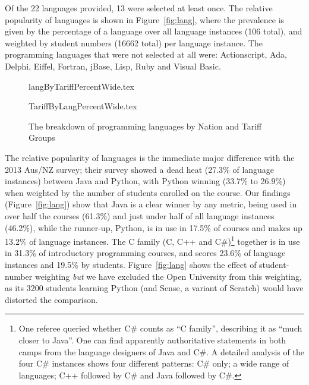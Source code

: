 \documentclass[english,submission]{programming}
\begin{document}
Of the 22 languages provided, 13 were selected at least once. The
relative popularity of languages is shown in Figure~\ref{fig:lang},
where the prevalence is given by the percentage of a language over all
language instances (106 total), and weighted by student numbers (16662
total) per language instance. The programming languages that were not
selected at all were: Actionscript, Ada, Delphi, Eiffel, Fortran,
jBase, Lisp, Ruby and Visual Basic.

\begin{figure}
\begin{center}
{langByTariffPercentWide.tex}
\end{center}%
%
\begin{center}
{TariffByLangPercentWide.tex}
\end{center}
\caption{The breakdown of programming languages by Nation and Tariff Groups\label{fig;LangTariff}}
\end{figure}

The relative popularity of languages is the immediate major difference
with the 2013 Aus/NZ survey; their survey showed a dead heat (27.3\%
of language instances) between Java and Python, with Python winning
(33.7\% to 26.9\%) when weighted by the number of students enrolled on
the course.  Our findings (Figure~\ref{fig:lang}) show that Java is a
clear winner by any metric, being used in over half the courses
(61.3\%) and just under half of all language instances (46.2\%), while
the runner-up, Python, is in use in 17.5\% of courses and makes up
13.2\% of language instances. The C family (C, C++ and C\#)\footnote{One referee queried whether C\# counts as ``C family'', describing it as ``much closer to Java''. One can find apparently authoritative statements in both camps from the language designers of Java and C\#. A detailed analysis of the four C\# instances shows four different patterns: C\# only; a wide range of languages; C++ followed by C\# and Java followed by C\#.} together
is in use in 31.3\% of introductory programming courses, and scores
23.6\% of language instances and 19.5\% by
students. Figure~\ref{fig:lang} shows the effect of student-number
weighting \emph{but} we have excluded the Open University from this
weighting, as its 3200 students learning Python (and Sense, a variant
of Scratch) would have distorted the comparison.
\end{document}
